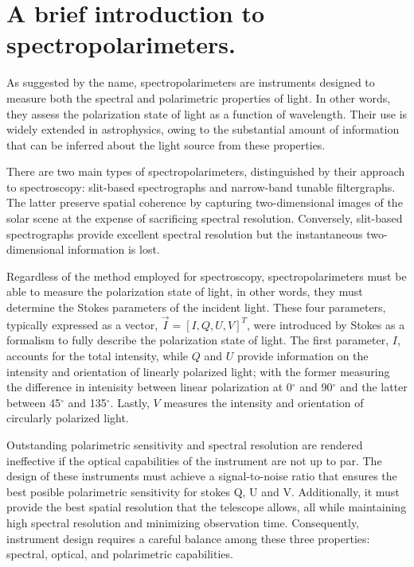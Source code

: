 \section{A brief introduction to spectropolarimeters.}

As suggested by the name, spectropolarimeters are instruments designed to measure both the spectral and polarimetric properties of light. In other words, they assess the polarization state of light as a function of wavelength. Their use is widely extended in astrophysics, owing to the substantial amount of information that can be inferred about the light source from these properties.

There are two main types of spectropolarimeters, distinguished by their approach to spectroscopy: slit-based spectrographs and narrow-band tunable filtergraphs. The latter preserve spatial coherence by capturing two-dimensional images of the solar scene at the expense of sacrificing spectral resolution. Conversely, slit-based spectrographs provide excellent spectral resolution but the instantaneous two-dimensional information is lost. 

Regardless of the method employed for spectroscopy, spectropolarimeters must be able to measure the polarization state of light, in other words, they must determine the Stokes parameters of the incident light. These four parameters, typically expressed as a vector, $ \vec{I} = [I, Q, U, V] ^{T}$, were introduced by Stokes \citep{Stokes_vector} as a formalism to fully describe the polarization state of light. The first parameter, $I$, accounts for the total intensity, while $Q$ and $U$ provide information on the intensity and orientation of linearly polarized light; with the former measuring the difference in intenisity between linear polarization at 0$^{\circ}$ and 90$^{\circ}$ and the latter between 45$^{\circ}$ and 135$^{\circ}$. Lastly, $V$ measures the intensity and orientation of circularly polarized light. 


Outstanding polarimetric sensitivity and spectral resolution are rendered ineffective if the optical capabilities of the instrument are not up to par. The design of these instruments must achieve a signal-to-noise ratio that ensures the best posible polarimetric sensitivity for stokes Q, U and V. Additionally, it must provide the best spatial resolution that the telescope allows, all while maintaining high spectral resolution and minimizing observation time. Consequently, instrument design requires a careful balance among these three properties: spectral, optical, and polarimetric capabilities.

